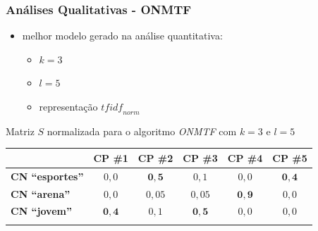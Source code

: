 \documentclass[10pt]{beamer}
\begin{document}

\begin{frame}
\frametitle{Análises Qualitativas - ONMTF}

  \begin{itemize}
    \item melhor modelo gerado na análise quantitativa:
    \begin{itemize}
      \item $k = 3$
      \item $l = 5$
      \item representação $\textit{tfidf}_{norm}$
    \end{itemize}
  \end{itemize}

  Matriz $S$ normalizada para o algoritmo \textit{ONMTF} com $k = 3$ e $l = 5$
  \begin{table}[H]
      \centering
      \begin{tabular}{lccccc}
          \hline
           & \textbf{CP \#1} & \textbf{CP \#2} & \textbf{CP \#3} & \textbf{CP \#4} & \textbf{CP \#5} \\
          \hline
          \textbf{CN ``esportes''} & $0,0$ & $\mathbf{0,5}$  & $0,1$  & $0,0$ & $\mathbf{0,4}$ \\
          \textbf{CN ``arena''}    & $0,0$ & $0,05$ & $0,05$ & $\mathbf{0,9}$ & $0,0$ \\
          \textbf{CN ``jovem''}    & $\mathbf{0,4}$ & $0,1$  & $\mathbf{0,5}$  & $0,0$ & $0,0$ \\
          \hline \\
      \end{tabular}
  \end{table}


\end{frame}

\end{document}
